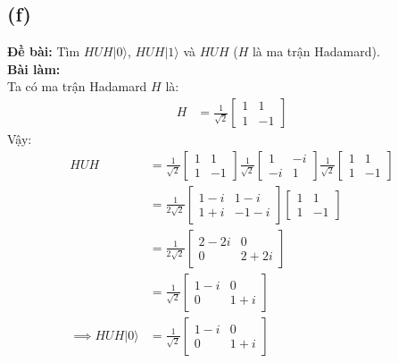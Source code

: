 \subsection{(f)}
\textbf{Đề bài:} Tìm $HUH|0\rangle$, $HUH|1\rangle$ và $HUH$ ($H$ là ma trận Hadamard).\\
\textbf{Bài làm:}\\
Ta có ma trận Hadamard $H$ là:
\begin{align*}
    H &= \frac{1}{\sqrt{2}}\begin{bmatrix}
        1 & 1\\
        1 & -1
    \end{bmatrix}
\end{align*}
Vậy:
\begin{align*}
    HUH &= \frac{1}{\sqrt{2}}\begin{bmatrix}
        1 & 1\\
        1 & -1
    \end{bmatrix}
    \frac{1}{\sqrt{2}}\begin{bmatrix}
        1 & -i\\
        -i & 1
    \end{bmatrix}
    \frac{1}{\sqrt{2}}\begin{bmatrix}
        1 & 1\\
        1 & -1
    \end{bmatrix}\\
    &= \frac{1}{2\sqrt{2}}\begin{bmatrix}
        1 - i & 1 - i\\
        1 + i & -1 - i
    \end{bmatrix}
    \begin{bmatrix}
        1 & 1\\
        1 & -1
    \end{bmatrix}\\
    &= \frac{1}{2\sqrt{2}}\begin{bmatrix}
        2 - 2i & 0\\
        0 & 2 + 2i
    \end{bmatrix} \\
    &= \frac{1}{\sqrt{2}}\begin{bmatrix}
        1 - i & 0\\
        0 & 1 + i
    \end{bmatrix}\\
    \implies HUH|0\rangle &= \frac{1}{\sqrt{2}}\begin{bmatrix}
        1 - i & 0\\
        0 & 1 + i

\end{bmatrix}
\end{align*}

